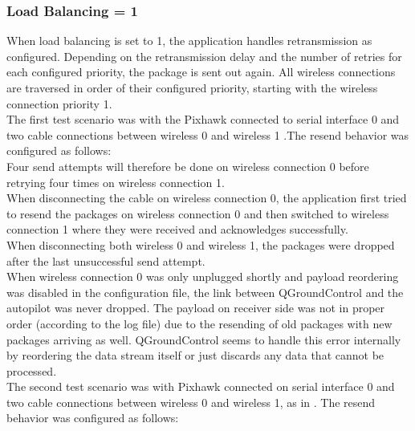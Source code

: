 \subsubsection{Load Balancing = 1}
When load balancing is set to 1, the application handles retransmission as configured. Depending on the retransmission delay and the number of retries for each configured priority, the package is sent out again. All wireless connections are traversed in order of their configured priority, starting with the wireless connection priority 1.\\
The first test scenario was with the Pixhawk connected to serial interface 0 and two cable connections between wireless 0 and wireless 1 .The resend behavior was configured as follows:\\
\noindent{}
Four send attempts will therefore be done on wireless connection 0 before retrying four times on wireless connection 1.\\
When disconnecting the cable on wireless connection 0, the application first tried to resend the packages on wireless connection 0 and then switched to wireless connection 1 where they were received and acknowledges successfully.\\
When disconnecting both wireless 0 and wireless 1, the packages were dropped after the last unsuccessful send attempt.\\
When wireless connection 0 was only unplugged shortly and payload reordering was disabled in the configuration file, the link between QGroundControl and the autopilot was never dropped. The payload on receiver side was not in proper order (according to the log file) due to the resending of old packages with new packages arriving as well. QGroundControl seems to handle this error internally by reordering the data stream itself or just discards any data that cannot be processed.\\
The second test scenario was with Pixhawk connected on serial interface 0 and two cable connections between wireless 0 and wireless 1, as in . The resend behavior was configured as follows:\\
